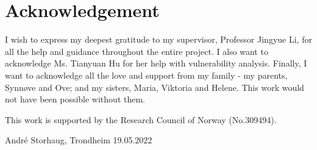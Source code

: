 \chapter*{Acknowledgement}
I wish to express my deepest gratitude to my supervisor, Professor Jingyue Li, for all the help and guidance throughout the entire project. I also want to acknowledge Ms. Tianyuan Hu for her help with vulnerability analysis. Finally, I want to acknowledge all the love and support from my family - my parents, Synnøve and Ove; and my sisters, Maria, Viktoria and Helene. This work would not have been possible without them.

\bigskip\noindent
This work is supported by the Research Council of Norway (No.309494).

\begin{flushright}
    André Storhaug, Trondheim 19.05.2022
\end{flushright}